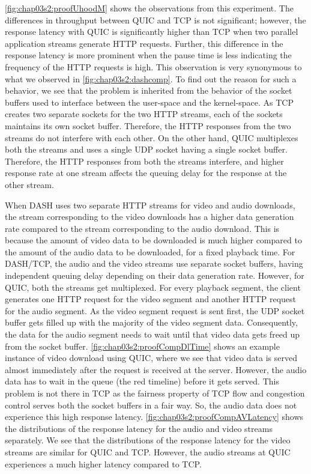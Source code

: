 \fig\ref{fig:chap03s2:proofUhoodM} shows the observations from this experiment. The differences in throughput between QUIC and TCP is not significant; however, the response latency with QUIC is significantly higher than TCP when two parallel application streams generate HTTP requests. Further, this difference in the response latency is more prominent when the pause time is less indicating the frequency of the HTTP requests is high. This observation is very synonymous to what we observed in \fig\ref{fig:chap03s2:dashcomp}. To find out the reason for such a behavior, we see that the problem is inherited from the behavior of the socket buffers used to interface between the user-space and the kernel-space. As TCP creates two separate sockets for the two HTTP streams, each of the sockets maintains its own socket buffer. Therefore, the HTTP responses from the two streams do not interfere with each other. On the other hand, QUIC multiplexes both the streams and uses a single UDP socket having a single socket buffer. Therefore, the HTTP responses from both the streams interfere, and higher response rate at one stream affects the queuing delay for the response at the other stream. 


When DASH uses two separate HTTP streams for video and audio downloads, the stream corresponding to the video downloads has a higher data generation rate compared to the stream corresponding to the audio download. This is because the amount of video data to be downloaded is much higher compared to the amount of the audio data to be downloaded, for a fixed playback time. For DASH/TCP, the audio and the video streams use separate socket buffers, having independent queuing delay depending on their data generation rate. However, for QUIC, both the streams get multiplexed. For every playback segment, the client generates one HTTP request for the video segment and another HTTP request for the audio segment. As the video segment request is sent first, the UDP socket buffer gets filled up with the majority of the video segment data. Consequently, the data for the audio segment needs to wait until that video data gets freed up from the socket buffer. \fig\ref{fig:chap03s2:proofCompDlTime} shows an example instance of video download using QUIC, where we see that video data is served almost immediately after the request is received at the server. However, the audio data has to wait in the queue (the red timeline) before it gets served. This problem is not there in TCP as the fairness property of TCP flow and congestion control serves both the socket buffers in a fair way. So, the audio data does not experience this high response latency. \fig\ref{fig:chap03s2:proofCompAVLatency} shows the distributions of the response latency for the audio and video streams separately. We see that the distributions of the response latency for the video streams are similar for QUIC and TCP. However, the audio streams at QUIC experiences a much higher latency compared to TCP. 


